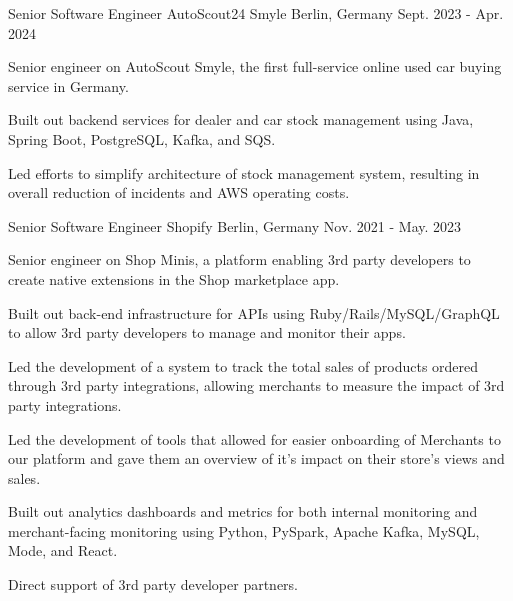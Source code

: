\begin{cventries}
  \cventry
  {Senior Software Engineer} %
  {AutoScout24 Smyle} %
  {Berlin, Germany} %
  {Sept. 2023 - Apr. 2024} %
  {
    \begin{cvitems} %
      \item {Senior engineer on AutoScout Smyle, the first full-service online used car buying service in Germany.}
      \item {Built out backend services for dealer and car stock management using Java, Spring Boot, PostgreSQL, Kafka, and SQS.}
      \item {Led efforts to simplify architecture of stock management system, resulting in overall reduction of incidents and AWS operating costs.}
    \end{cvitems}
  }

  \cventry
  {Senior Software Engineer} %
  {Shopify} %
  {Berlin, Germany} %
  {Nov. 2021 - May. 2023} %
  {
    \begin{cvitems} %
      \item {Senior engineer on Shop Minis, a platform enabling 3rd party developers to create native extensions in the Shop marketplace app.}
      \item {Built out back-end infrastructure for APIs using Ruby/Rails/MySQL/GraphQL to allow 3rd party developers to manage and monitor their apps.}
      \item {Led the development of a system to track the total sales of products ordered through 3rd party integrations, allowing merchants to measure the impact of 3rd party integrations.}
      \item {Led the development of tools that allowed for easier onboarding of Merchants to our platform and gave them an overview of it’s impact on their store’s views and sales.}
      \item {Built out analytics dashboards and metrics for both internal monitoring and merchant-facing monitoring using Python, PySpark, Apache Kafka, MySQL, Mode, and React.}
      \item {Direct support of 3rd party developer partners.}
    \end{cvitems}
  }


\end{cventries}

